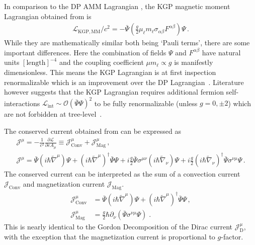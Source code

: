 In comparison to the DP AMM Lagrangian , the KGP magnetic moment Lagrangian obtained from  is
\begin{align}
    \label{lagrangian:2}
    \mathcal{L}_\mathrm{KGP,MM}/c^{2} = -{\bar\Psi}\left(\frac{g}{2}\mu_{\ell} m_{\ell}\sigma_{\alpha\beta}F^{\alpha\beta}\right)\Psi\,.
\end{align}
While they are mathematically similar both being `Pauli terms', there are some important differences. Here the combination of fields $\Psi$ and $F^{\alpha\beta}$ have natural units $[\mathrm{length}]^{-4}$ and the coupling coefficient $\mu m_{\ell}\!\propto\!g$ is manifestly dimensionless. This means the KGP Lagrangian is at first inspection renormalizable which is an improvement over the DP Lagrangian~\citep{Rafelski:2022bsv}. Literature however suggests that the KGP Lagrangian requires additional fermion self-interactions $\mathcal{L}_\mathrm{int}\sim\mathcal{O}(\bar\Psi\Psi)^{2}$ to be fully renormalizable (unless $g\!=\!0,\pm2$) which are not forbidden at tree-level~\citep{Angeles-Martinez:2011wpn,Vaquera-Araujo:2012jlk}.

The conserved current obtained from  can be expressed as
\begin{gather}
\label{norm:2}
\mathcal{J}^{\mu}=-\frac{1}{c^{2}}\frac{\partial\mathcal{L}}{\partial eA_{\mu}}\equiv 
 \mathcal{J}^\mu_{\mathrm{Conv}}+\mathcal{J}^\mu_{\mathrm{Mag}}\,, \\
\mathcal{J}^{\mu}=\bar{\Psi}\left(i\hbar{\widetilde\nabla}^{\mu}\right)\Psi + \left(i\hbar{\widetilde\nabla}^{\mu}\right)^{\dag}\bar{\Psi}\Psi + i\frac{g}{2}\bar{\Psi}\sigma^{\mu\nu}\left(i\hbar{\widetilde\nabla}_{\nu}\right)\Psi + i\frac{g}{2}\left(i\hbar{\widetilde\nabla}_{\nu}\right)^{\dag}\bar{\Psi}\sigma^{\nu\mu}\Psi\,.
\end{gather}
The conserved current  can be interpreted as the sum of a convection current $\mathcal{J}_{\mathrm{Conv}}$ and magnetization current $\mathcal{J}_{\mathrm{Mag}}$.
\begin{align}
\label{norm:3a}\mathcal{J}^{\mu}_{\mathrm{Conv}}&=\bar{\Psi}\left(i\hbar{\widetilde\nabla}^{\mu}\right)\Psi + \left(i\hbar{\widetilde\nabla}^{\mu}\right)^{\dag}\bar{\Psi}\Psi\,,\\
\label{norm:3b} 
\mathcal{J}^{\mu}_{\mathrm{Mag}}&=\frac{g}{2}\hbar{\partial}_{\nu}\left(\bar{\Psi}\sigma^{\nu\mu}\Psi\right)\;.
\end{align}
 This is nearly identical to the Gordon Decomposition of the Dirac current $\mathcal{J}_\mathrm{D}^{\mu}$, with the exception that the magnetization current is proportional to $g$-factor.
 
